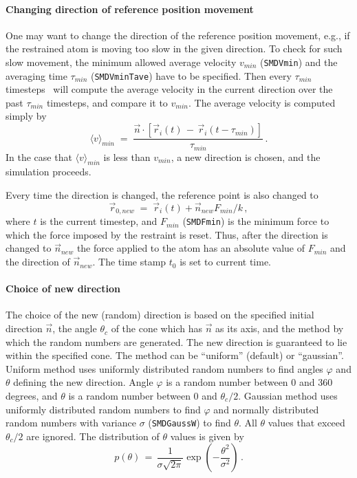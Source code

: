 \paragraph*{Changing direction of reference position movement}

One may want to change the direction of the reference position
movement, e.g., if the restrained atom is moving too slow in the given
direction. To check for such slow movement, the minimum allowed
average velocity $v_{min}$ ({\tt SMDVmin}) and the averaging time
$\tau_{min}$ ({\tt SMDVminTave}) have to be specified. Then every
$\tau_{min}$ timesteps \NAMD\ will compute the average velocity in the
current direction over the past $\tau_{min}$ timesteps, and compare it
to $v_{min}$. The average velocity is computed simply by 
\begin{equation}
   \langle v\rangle_{min} \; = \; \frac{\vec n \cdot [\vec r_i(t) \, - \,
   	\vec r_i(t - \tau_{min}) ]}{\tau_{min}} \, .
\label{eq:smdvmin}
\end{equation}
In the case that $\langle v\rangle_{min}$ is less than $v_{min}$, 
a new direction is chosen, and the simulation proceeds. 

Every time the direction is changed, the reference point is also
changed to
\begin{equation}
  \vec r_{0,new} \; = \; \vec r_i(t) + \vec n_{new} F_{min}/k \, ,
\label{eq:smdreset}
\end{equation}
where $t$ is the current timestep, and $F_{min}$ ({\tt SMDFmin}) is
the minimum force to which the force imposed by the restraint is
reset. Thus, after the direction is changed to $\vec n_{new}$ the
force applied to the atom has an absolute value of $F_{min}$ and the
direction of $\vec n_{new}$. The time stamp $t_0$ is set to current
time.


\paragraph*{Choice of new direction}
The choice of the new (random) direction is based on the specified
initial direction $\vec n$, the angle $\theta_c$ of the cone which has
$\vec n$ as its axis, and the method by which the random numbers are
generated.  The new direction is guaranteed to lie within the
specified cone. The method can be ``uniform'' (default) or
``gaussian''. Uniform method uses uniformly distributed random numbers
to find angles $\varphi$ and $\theta$ defining the new
direction. Angle $\varphi$ is a random number between 0 and 360
degrees, and $\theta$ is a random number between 0 and
$\theta_c/2$. Gaussian method uses uniformly distributed random
numbers to find $\varphi$ and normally distributed random numbers with
variance $\sigma$ ({\tt SMDGaussW}) to find $\theta$. All $\theta$
values that exceed $\theta_c/2$ are ignored. The distribution of
$\theta$ values is given by 
\begin{equation}
p(\theta) \, = \, \frac{1}{\sigma \sqrt{2\pi}} 
\exp(- \frac{\theta^2}{\sigma^2}) \, .
\end{equation}

